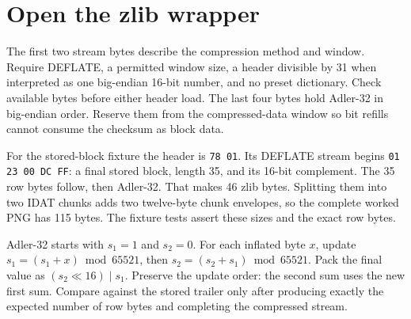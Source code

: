 \section{Open the zlib wrapper}
The first two stream bytes describe the compression method and window. Require
DEFLATE, a permitted window size, a header divisible by 31 when interpreted as one
big-endian 16-bit number, and no preset dictionary. Check available bytes before either
header load. The last four bytes hold Adler-32 in big-endian order. Reserve them from
the compressed-data window so bit refills cannot consume the checksum as block data.

For the stored-block fixture the header is \texttt{78 01}. Its DEFLATE stream begins
\texttt{01 23 00 DC FF}: a final stored block, length 35, and its 16-bit complement.
The 35 row bytes follow, then Adler-32. That makes 46 zlib bytes. Splitting them into
two IDAT chunks adds two twelve-byte chunk envelopes, so the complete worked PNG has
115 bytes. The fixture tests assert these sizes and the exact row bytes.

Adler-32 starts with $s_1=1$ and $s_2=0$. For each inflated byte $x$, update
$s_1=(s_1+x)\bmod65521$, then $s_2=(s_2+s_1)\bmod65521$. Pack the final value as
$(s_2\ll16)\mathbin{|}s_1$. Preserve the update order: the second sum uses the new
first sum. Compare against the stored trailer only after producing exactly the
expected number of row bytes and completing the compressed stream.
